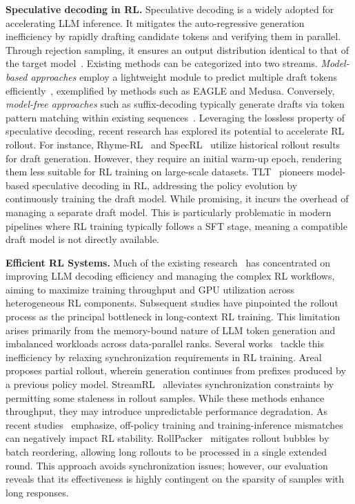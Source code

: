 \textbf{Speculative decoding in RL.}
Speculative decoding is a widely adopted for accelerating LLM inference. It mitigates the auto-regressive generation inefficiency by rapidly drafting candidate tokens and verifying them in parallel. Through rejection sampling, it ensures an output distribution identical to that of the target model~\cite{leviathan2023fast}.
Existing methods can be categorized into two streams. \textit{Model-based approaches} employ a lightweight module to predict multiple draft tokens efficiently~\cite{li2024eagle, li2025eagle3, cai2024medusa, ankner2024hydra, yi2024generation}, exemplified by methods such as EAGLE and Medusa. Conversely, \textit{model-free approaches} such as suffix-decoding typically generate drafts via token pattern matching within existing sequences~\cite{oliaro2025suffixdecoding, luo2025turning_recycle_ngram, saxena2023prompt_lookup}.
Leveraging the lossless property of speculative decoding, recent research has explored its potential to accelerate RL rollout. For instance, Rhyme-RL~\cite{he2025history_rhyme} and SpecRL~\cite{liu2025specRL} utilize historical rollout results for draft generation. However, they require an initial warm-up epoch, rendering them less suitable for RL training on large-scale datasets. TLT~\cite{hu2025taming} pioneers model-based speculative decoding in RL, addressing the policy evolution by continuously training the draft model. While promising, it incurs the overhead of managing a separate draft model. This is particularly problematic in modern pipelines where RL training typically follows a SFT stage, meaning a compatible draft model is not directly available.


\textbf{Efficient RL Systems.}
Much of the existing research~\cite{sheng2025hybridflow, zhong2025rlhfuse, hu2024openrlhf, chen2026tokenflow, chen2025pre3} has concentrated on improving LLM decoding efficiency and managing the complex RL workflows, aiming to maximize training throughput and GPU utilization across heterogeneous RL components.
Subsequent studies have pinpointed the rollout process as the principal bottleneck in long-context RL training. This limitation arises primarily from the memory-bound nature of LLM token generation and imbalanced workloads across data-parallel ranks. Several works~\cite{slime_github, zhong2025streamrl, fu2025areal} tackle this inefficiency by relaxing synchronization requirements in RL training.
Areal~\cite{fu2025areal} proposes partial rollout, wherein generation continues from prefixes produced by a previous policy model. StreamRL~\cite{zhong2025streamrl} alleviates synchronization constraints by permitting some staleness in rollout samples. While these methods enhance throughput, they may introduce unpredictable performance degradation. As recent studies~\cite{xi2026jet, qi2025defeating, liuspeed} emphasize, off-policy training and training-inference mismatches can negatively impact RL stability.
RollPacker~\cite{gao2025rollpacker} mitigates rollout bubbles by batch reordering, allowing long rollouts to be processed in a single extended round. This approach avoids synchronization issues; however, our evaluation reveals that its effectiveness is highly contingent on the sparsity of samples with long responses.